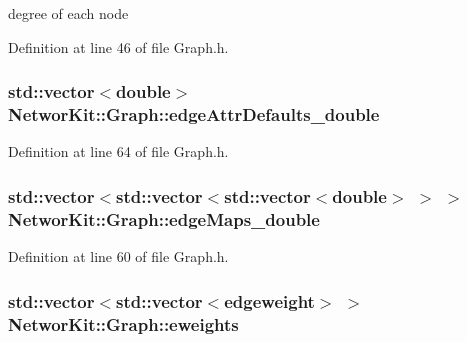 degree of each node 



Definition at line 46 of file Graph.\-h.

\hypertarget{class_networ_kit_1_1_graph_ac3f25277b53638e1486cde303803eb0a}{
\subsubsection[{edge\-Attr\-Defaults\-\_\-double}]{\setlength{\rightskip}{0pt plus 5cm}std\-::vector$<$double$>$ Networ\-Kit\-::\-Graph\-::edge\-Attr\-Defaults\-\_\-double\hspace{0.3cm}{\ttfamily [protected]}}}\label{class_networ_kit_1_1_graph_ac3f25277b53638e1486cde303803eb0a}


Definition at line 64 of file Graph.\-h.

\hypertarget{class_networ_kit_1_1_graph_a63a00d1d3330ce8050fcd77794ec8d45}{
\subsubsection[{edge\-Maps\-\_\-double}]{\setlength{\rightskip}{0pt plus 5cm}std\-::vector$<$std\-::vector$<$std\-::vector$<$double$>$ $>$ $>$ Networ\-Kit\-::\-Graph\-::edge\-Maps\-\_\-double\hspace{0.3cm}{\ttfamily [protected]}}}\label{class_networ_kit_1_1_graph_a63a00d1d3330ce8050fcd77794ec8d45}


Definition at line 60 of file Graph.\-h.

\hypertarget{class_networ_kit_1_1_graph_a6fb34025f32ff2850911ee0e90b085fa}{
\subsubsection[{eweights}]{\setlength{\rightskip}{0pt plus 5cm}std\-::vector$<$std\-::vector$<${\bf edgeweight}$>$ $>$ Networ\-Kit\-::\-Graph\-::eweights\hspace{0.3cm}{\ttfamily [protected]}}}\label{class_networ_kit_1_1_graph_a6fb34025f32ff2850911ee0e90b085fa}


